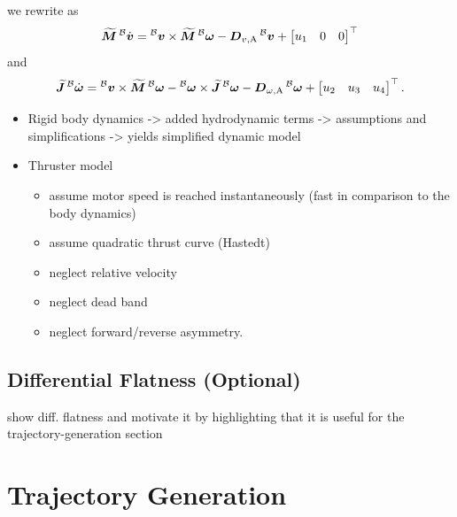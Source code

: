 we rewrite  as
\begin{equation}
	\label{eq:eom-translational-with-input}
	\mbox{$\widetilde{\bm{M}}$} \prescript{\mathcal{B}}{}{\mbox{$\dot{\bm{v}}$}} =
	\prescript{\mathcal{B}}{}{\mbox{$\bm{v}$}} \times \mbox{$\widetilde{\bm{M}}$} \prescript{\mathcal{B}}{}{\mbox{$\bm{\omega}$}}
	-\mbox{$\bm{D}$}_{v,\text{A}} \prescript{\mathcal{B}}{}{\mbox{$\bm{v}$}}
	+
	\begin{bmatrix}
		u_1 & 0 & 0
	\end{bmatrix}^\top
\end{equation}
and
\begin{equation}
	\label{eq:eom-rotational-with-input}
	\mbox{$\widetilde{\bm{J}}$} \prescript{\mathcal{B}}{}{\mbox{$\dot{\bm{\omega}}$}} =
	\prescript{\mathcal{B}}{}{\mbox{$\bm{v}$}} \times \mbox{$\widetilde{\bm{M}}$} \prescript{\mathcal{B}}{}{\mbox{$\bm{\omega}$}}
	- \prescript{\mathcal{B}}{}{\mbox{$\bm{\omega}$}} \times \mbox{$\widetilde{\bm{J}}$} \prescript{\mathcal{B}}{}{\mbox{$\bm{\omega}$}}
	- \mbox{$\bm{D}$}_{\omega,\text{A}} \prescript{\mathcal{B}}{}{\mbox{$\bm{\omega}$}}
	+
	\begin{bmatrix}
		u_2 & u_3 & u_4
	\end{bmatrix}^\top
	.
\end{equation}

\begin{itemize}
	\color{red}
	\item Rigid body dynamics -> added hydrodynamic terms -> assumptions and simplifications -> yields simplified dynamic model
	\item Thruster model
	\begin{itemize}
		\item assume motor speed is reached instantaneously (fast in comparison to the body dynamics)
		\item assume quadratic thrust curve (Hastedt)
		\item neglect relative velocity
		\item neglect dead band
		\item neglect forward/reverse asymmetry.
	\end{itemize}
\end{itemize}

\subsection{Differential Flatness (Optional)}
\label{sec:differential-flatness}
{\color{red}
	show diff. flatness and motivate it by highlighting that it is useful for the trajectory-generation section
}

\section{Trajectory Generation}
\label{sec:trajectory-generation}

